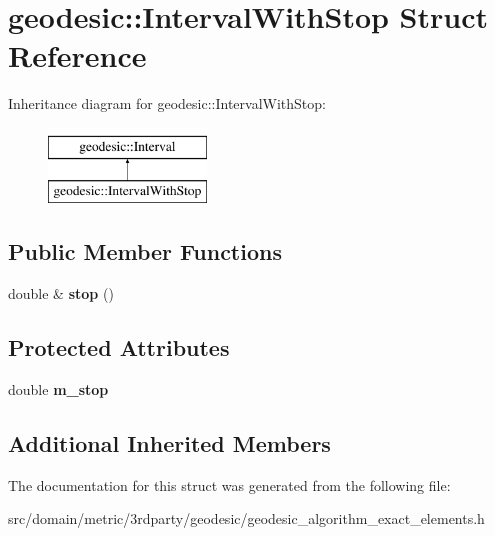 \hypertarget{structgeodesic_1_1_interval_with_stop}{}\section{geodesic\+:\+:Interval\+With\+Stop Struct Reference}
\label{structgeodesic_1_1_interval_with_stop}
Inheritance diagram for geodesic\+:\+:Interval\+With\+Stop\+:\begin{figure}[H]
\begin{center}
\leavevmode
\includegraphics[height=2.000000cm]{structgeodesic_1_1_interval_with_stop}
\end{center}
\end{figure}
\subsection*{Public Member Functions}
\begin{DoxyCompactItemize}
\item 
\hypertarget{structgeodesic_1_1_interval_with_stop_ad40d1b39a99fe69dcf19aabbc17d1454}{}double \& {\bfseries stop} ()\label{structgeodesic_1_1_interval_with_stop_ad40d1b39a99fe69dcf19aabbc17d1454}

\end{DoxyCompactItemize}
\subsection*{Protected Attributes}
\begin{DoxyCompactItemize}
\item 
\hypertarget{structgeodesic_1_1_interval_with_stop_a5a646e636ac047b9b7d913eec283caf1}{}double {\bfseries m\+\_\+stop}\label{structgeodesic_1_1_interval_with_stop_a5a646e636ac047b9b7d913eec283caf1}

\end{DoxyCompactItemize}
\subsection*{Additional Inherited Members}


The documentation for this struct was generated from the following file\+:\begin{DoxyCompactItemize}
\item 
src/domain/metric/3rdparty/geodesic/geodesic\+\_\+algorithm\+\_\+exact\+\_\+elements.\+h\end{DoxyCompactItemize}
